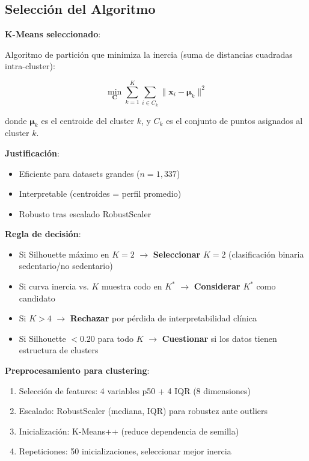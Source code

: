 \documentclass[12pt,letterpaper,twoside]{report}
\newcommand{\vect}[1]{\boldsymbol{#1}}
\newcommand{\mat}[1]{\mathbf{#1}}
\begin{document}
\subsection{Selección del Algoritmo}

\begin{estadisticobox}
\textbf{K-Means seleccionado}:

Algoritmo de partición que minimiza la inercia (suma de distancias cuadradas intra-cluster):

\begin{equation}
\min_{\mat{C}} \sum_{k=1}^{K} \sum_{i \in C_k} \|\vect{x}_i - \vect{\mu}_k\|^2
\end{equation}

donde $\vect{\mu}_k$ es el centroide del cluster $k$, y $C_k$ es el conjunto de puntos asignados al cluster $k$.

\textbf{Justificación}:
\begin{itemize}[noitemsep]
    \item Eficiente para datasets grandes ($n=1,337$)
    \item Interpretable (centroides = perfil promedio)
    \item Robusto tras escalado RobustScaler
\end{itemize}
\end{estadisticobox}

\begin{reglabox}
\textbf{Regla de decisión}:

\begin{itemize}[noitemsep]
    \item Si Silhouette máximo en $K=2$ $\to$ \textbf{Seleccionar} $K=2$ (clasificación binaria sedentario/no sedentario)
    \item Si curva inercia vs. $K$ muestra codo en $K^*$ $\to$ \textbf{Considerar} $K^*$ como candidato
    \item Si $K > 4$ $\to$ \textbf{Rechazar} por pérdida de interpretabilidad clínica
    \item Si Silhouette $< 0.20$ para todo $K$ $\to$ \textbf{Cuestionar} si los datos tienen estructura de clusters
\end{itemize}
\end{reglabox}

\begin{calculobox}
\textbf{Preprocesamiento para clustering}:

\begin{enumerate}[noitemsep]
    \item Selección de features: 4 variables p50 + 4 IQR (8 dimensiones)
    \item Escalado: RobustScaler (mediana, IQR) para robustez ante outliers
    \item Inicialización: K-Means++ (reduce dependencia de semilla)
    \item Repeticiones: 50 inicializaciones, seleccionar mejor inercia
\end{enumerate}
\end{calculobox}
\end{document}
